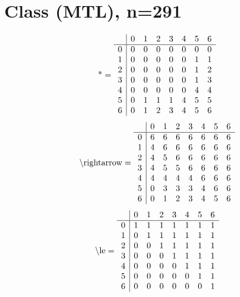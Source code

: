 \documentclass[11pt]{article}
\begin{document}
\section{Class (MTL), n=291}
\[\text{*} = 
\begin{array}{r | r r r r r r r}
 & 0 & 1 & 2 & 3 & 4 & 5 & 6 \\ \hline
0 & 0 & 0 & 0 & 0 & 0 & 0 & 0 \\
1 & 0 & 0 & 0 & 0 & 0 & 1 & 1 \\
2 & 0 & 0 & 0 & 0 & 0 & 1 & 2 \\
3 & 0 & 0 & 0 & 0 & 0 & 1 & 3 \\
4 & 0 & 0 & 0 & 0 & 0 & 4 & 4 \\
5 & 0 & 1 & 1 & 1 & 4 & 5 & 5 \\
6 & 0 & 1 & 2 & 3 & 4 & 5 & 6 \\
\end{array}
\]
\[\text{\textbackslash rightarrow} = 
\begin{array}{r | r r r r r r r}
 & 0 & 1 & 2 & 3 & 4 & 5 & 6 \\ \hline
0 & 6 & 6 & 6 & 6 & 6 & 6 & 6 \\
1 & 4 & 6 & 6 & 6 & 6 & 6 & 6 \\
2 & 4 & 5 & 6 & 6 & 6 & 6 & 6 \\
3 & 4 & 5 & 5 & 6 & 6 & 6 & 6 \\
4 & 4 & 4 & 4 & 4 & 6 & 6 & 6 \\
5 & 0 & 3 & 3 & 3 & 4 & 6 & 6 \\
6 & 0 & 1 & 2 & 3 & 4 & 5 & 6 \\
\end{array}
\]
\[\text{\textbackslash le} = 
\begin{array}{r | r r r r r r r}
 & 0 & 1 & 2 & 3 & 4 & 5 & 6 \\ \hline
0 & 1 & 1 & 1 & 1 & 1 & 1 & 1 \\
1 & 0 & 1 & 1 & 1 & 1 & 1 & 1 \\
2 & 0 & 0 & 1 & 1 & 1 & 1 & 1 \\
3 & 0 & 0 & 0 & 1 & 1 & 1 & 1 \\
4 & 0 & 0 & 0 & 0 & 1 & 1 & 1 \\
5 & 0 & 0 & 0 & 0 & 0 & 1 & 1 \\
6 & 0 & 0 & 0 & 0 & 0 & 0 & 1 \\
\end{array}
\]
\end{document}
